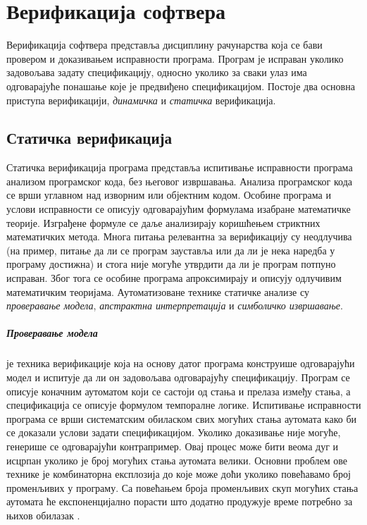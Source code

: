 \documentclass[12pt,oneside]{memoir}
\begin{document}
\chapter{Верификација софтвера} \label{verifikacija}
	Верификација софтвера представља дисциплину рачунарства која се бави провером и доказивањем исправности програма. Програм је исправан уколико задовољава задату спецификацију, односно уколико за сваки улаз има одговарајуће понашање које је предвиђено спецификацијом. Постоје два основна приступа верификацији, \textit{динамичка} и \textit{статичка} верификација.
  
  
  \section{Статичка верификација}
  \label{statver}
  Статичка верификација програма представља испитивање исправности програма анализом програмског кода, без његовог извршавања. Анализа програмског кода се врши углавном над изворним или објектним кодом. Особине програма и услови исправности се описују одговарајућим формулама изабране математичке теорије. Изграђене формуле се даље анализирају коришћењем стриктних математичких метода. Многа питања релевантна за верификацију су неодлучива (на пример, питање да ли се програм зауставља или да ли је нека наредба у програму достижна) и стога није могуће утврдити да ли је програм потпуно исправан. Због тога се особине програма апроксимирају и описују одлучивим математичким теоријама. Аутоматизоване технике статичке анализе су \textit{проверавање модела}, \textit{апстрактна интерпретација} и \textit{симболичко извршавање}.  
  
\paragraph{Проверавање модела} је техника верификације која на основу датог програма конструише одговарајући модел и испитује да ли он задовољава одговарајућу спецификацију. Програм се описује коначним аутоматом који се састоји од стања и прелаза између стања, а спецификација се описује формулом темпоралне логике. Испитивање исправности програма се врши систематским обиласком свих могућих стања аутомата како би се доказали услови задати спецификацијом. Уколико доказивање није могуће, генерише се одговарајући контрапример. Овај процес може бити веома дуг и исцрпан уколико је број могућих стања аутомата велики. Основни проблем ове технике је комбинаторна експлозија до које може доћи уколико повећавамо број променљивих у програму. Са повећањем броја променљивих скуп могућих стања аутомата ће експоненцијално порасти што додатно продужује време потребно за њихов обилазак \cite{mvjphd,verif_tech}.
\end{document}
